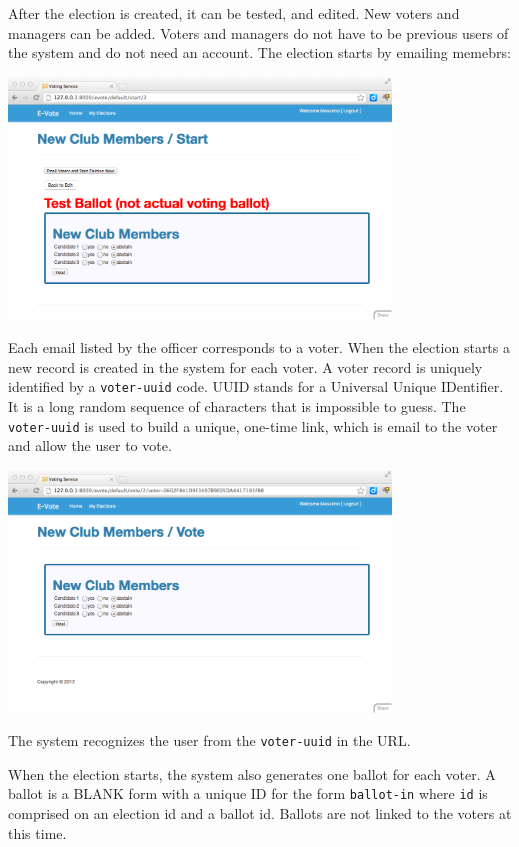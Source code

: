 \documentclass[12pt]{article}
\begin{document}
After the election is created, it can be tested, and edited. New voters and managers can be added. Voters and managers do not have to be previous users of the system and do not need an account. The election starts by emailing memebrs:
\begin{center}
\includegraphics[width=4in]{images/start.png}
\end{center}
Each email listed by the officer corresponds to a voter. When the election starts a new record is created in the system for each voter. A voter record is uniquely identified by a {\tt voter-uuid} code. UUID stands for a Universal Unique IDentifier. It is a long random sequence of characters that is impossible to guess. The {\tt voter-uuid} is used to build a unique, one-time link, which is email to the voter and allow the user to vote.
\begin{center}
\includegraphics[width=4in]{images/vote.png}
\end{center}
The system recognizes the user from the {\tt voter-uuid} in the URL.

When the election starts, the system also generates one ballot for each voter. A ballot is a BLANK form with a unique ID for the form {\tt ballot-in} where {\tt id} is comprised on an election id and a ballot id. Ballots are not linked to the voters at this time.
\end{document}
